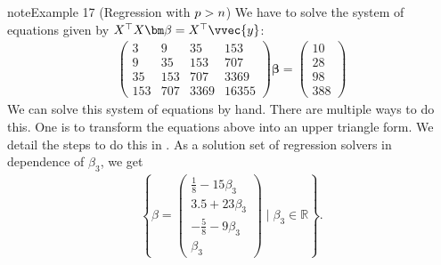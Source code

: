 \documentclass[letterpaper,10pt,english]{jupyterBook}
\begin{document}
\begin{sphinxadmonition}{note}{Example 17 (Regression with \protect\(p>n\protect\))}
\sphinxAtStartPar
We have to solve the system of equations given by \(X^\top X \bm\beta = X^\top \vvec{y}\):
\begin{align*}
\begin{pmatrix}
3 &     9 &    35 &   153\\
9 &    35 &   153 &   707\\
35&   153 &   707 &  3369\\
153&  707 &  3369 & 16355
\end{pmatrix} \bm\beta = 
\begin{pmatrix}
10\\  28\\  98\\ 388
\end{pmatrix}
\end{align*}
\sphinxAtStartPar
We can solve this system of equations by hand. There are multiple ways to do this. One is to transform the equations above into an upper triangle form. We detail the steps to do this in {\hyperref[\detokenize{regression_exercises:reg-exercises}]{}}. As a solution set of regression solvers in dependence of \(\beta_3\), we get
\begin{equation*}
\begin{split}\left\{\beta = \begin{pmatrix}\frac{1}{8}-15\beta_3\\3.5 +23\beta_3\\-\frac{5}{8} -9\beta_3\\\beta_3 \end{pmatrix} \mid \beta_3\in\mathbb{R} \right\}.\end{split}
\end{equation*}
\begin{center}\end{center}\end{sphinxadmonition}
\end{document}
